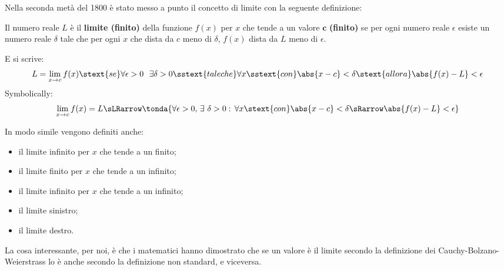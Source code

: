 Nella seconda metà del 1800 è stato messo a punto il concetto di limite
con la seguente definizione:

\begin{definizione}
Il numero reale \(L\) è il \textbf{limite (finito)} della funzione \(f(x)\) 
per \(x\) che tende a un valore \(\mathbf{c}\) \textbf{(finito)} se per ogni 
numero reale \(\epsilon\) esiste un numero reale \(\delta\) tale che per ogni 
\(x\) 
che dista da \(c\) meno di \(\delta\), \(f(x)\) dista da \(L\) 
meno di \(\epsilon\).

E si scrive:
\[L = \lim_{x \rightarrow c}f(x) \stext{se}
\forall \epsilon > 0 ~~ \exists \delta > 0 
\sstext{tale che} \forall x \sstext{con} \abs{x - c} < \delta
\stext{allora} 
\abs{f(x) - L} < \epsilon\]
Symbolically:
\[\lim_{x \to c} f(x) = L  \sLRarrow  
\tonda{\forall \epsilon > 0,\,
\exists ~ \delta > 0:\,\forall x \stext{con} \abs{x - c} < \delta
\sRarrow \abs{f(x) - L} < \epsilon}\]

\end{definizione}

In modo simile vengono definiti anche:
\begin{itemize}
\item il limite infinito per \(x\) che tende a un finito;
\item il limite finito per \(x\) che tende a un infinito;
\item il limite infinito per \(x\) che tende a un infinito;
\item il limite sinistro;
\item il limite destro.
\end{itemize}

La cosa interessante, per noi, è che i matematici hanno dimostrato che se un 
valore è il limite secondo la definizione dei Cauchy-Bolzano-Weierstrass 
lo è anche secondo la definizione non standard, e viceversa.
